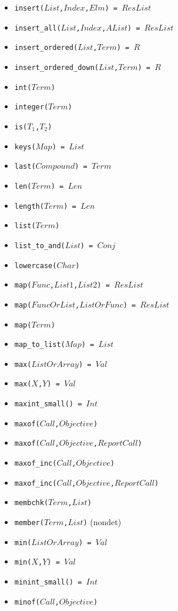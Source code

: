 \documentclass[10pt]{article}
\begin{document}
\begin{multicols}{2}
\begin{scriptsize}
\begin{itemize}
    \item \texttt{insert($List$,$Index$,$Elm$) = $ResList$}
    \item \texttt{insert\_all($List$,$Index$,$AList$) = $ResList$}
    \item \texttt{insert\_ordered($List$,$Term$) = $R$}
    \item \texttt{insert\_ordered\_down($List$,$Term$) = $R$}
    \item \texttt{int($Term$)}
    \item \texttt{integer($Term$)}
    \item \texttt{is($T_1$,$T_2$)}
    \item \texttt{keys($Map$) = $List$}
    \item \texttt{last($Compound$) = $Term$}
    \item \texttt{len($Term$) = $Len$}
    \item \texttt{length($Term$) = $Len$}
    \item \texttt{list($Term$)}
    \item \texttt{list\_to\_and($List$) = $Conj$}
    \item \texttt{lowercase($Char$)}
    \item \texttt{map($Func$,$List1$,$List2$) = $ResList$}
    \item \texttt{map($FuncOrList$,$ListOrFunc$) = $ResList$}
    \item \texttt{map($Term$)}
    \item \texttt{map\_to\_list($Map$) = $List$}
    \item \texttt{max($ListOrArray$) = $Val$}
    \item \texttt{max($X$,$Y$) = $Val$}
    \item \texttt{maxint\_small() = $Int$}
    \item \texttt{maxof($Call$,$Objective$)}
    \item \texttt{maxof($Call$,$Objective$,$ReportCall$)}
    \item \texttt{maxof\_inc($Call$,$Objective$)}
    \item \texttt{maxof\_inc($Call$,$Objective$,$ReportCall$)}
    \item \texttt{membchk($Term$,$List$)}
    \item \texttt{member($Term$,$List$)} (nondet)
    \item \texttt{min($ListOrArray$) = $Val$}
    \item \texttt{min($X$,$Y$) = $Val$}
    \item \texttt{minint\_small() = $Int$}
    \item \texttt{minof($Call$,$Objective$)}

\end{itemize}
\end{scriptsize}
\end{multicols}
\end{document}
